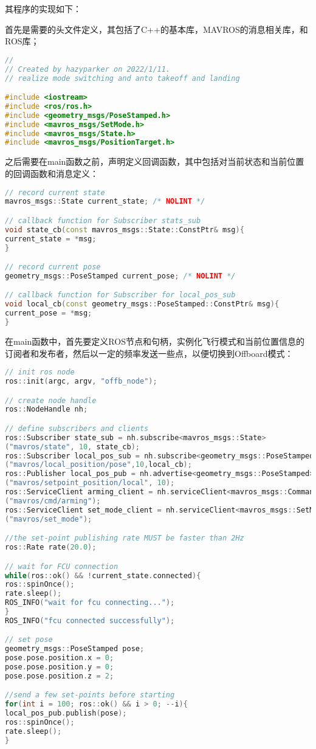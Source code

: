 其程序的实现如下：

首先是需要的头文件定义，其包括了C++的基本库，MAVROS的消息相关库，和ROS库；
\begin{lstlisting}[language={C++}]
//
// Created by hazyparker on 2022/1/11.
// realize mode switching and anto takeoff and landing

#include <iostream>
#include <ros/ros.h>
#include <geometry_msgs/PoseStamped.h>
#include <mavros_msgs/SetMode.h>
#include <mavros_msgs/State.h>
#include <mavros_msgs/PositionTarget.h>
\end{lstlisting}

之后需要在main函数之前，声明定义回调函数，其中包括对当前状态和当前位置的回调函数和消息定义：
\begin{lstlisting}[language={C++}]
// record current state
mavros_msgs::State current_state; /* NOLINT */

// callback function for Subscriber stats_sub
void state_cb(const mavros_msgs::State::ConstPtr& msg){
current_state = *msg;
}

// record current pose
geometry_msgs::PoseStamped current_pose; /* NOLINT */

// callback function for Subscriber for local_pos_sub
void local_cb(const geometry_msgs::PoseStamped::ConstPtr& msg){
current_pose = *msg;
}
\end{lstlisting}

在main函数中，首先要定义ROS节点和句柄，实例化飞行模式和当前位置信息的订阅者和发布者，然后以一定的频率发送一些点，以便切换到Offboard模式：
\begin{lstlisting}[language={C++}]
// init ros node
ros::init(argc, argv, "offb_node");

// create node handle
ros::NodeHandle nh;

// define subscribers and clients
ros::Subscriber state_sub = nh.subscribe<mavros_msgs::State>
("mavros/state", 10, state_cb);
ros::Subscriber local_pos_sub = nh.subscribe<geometry_msgs::PoseStamped>
("mavros/local_position/pose",10,local_cb);
ros::Publisher local_pos_pub = nh.advertise<geometry_msgs::PoseStamped>
("mavros/setpoint_position/local", 10);
ros::ServiceClient arming_client = nh.serviceClient<mavros_msgs::CommandBool>
("mavros/cmd/arming");
ros::ServiceClient set_mode_client = nh.serviceClient<mavros_msgs::SetMode>
("mavros/set_mode");

//the set-point publishing rate MUST be faster than 2Hz
ros::Rate rate(20.0);

// wait for FCU connection
while(ros::ok() && !current_state.connected){
ros::spinOnce();
rate.sleep();
ROS_INFO("wait for fcu connecting...");
}
ROS_INFO("fcu connected successfully");

// set pose
geometry_msgs::PoseStamped pose;
pose.pose.position.x = 0;
pose.pose.position.y = 0;
pose.pose.position.z = 2;

//send a few set-points before starting
for(int i = 100; ros::ok() && i > 0; --i){
local_pos_pub.publish(pose);
ros::spinOnce();
rate.sleep();
}
\end{lstlisting}

